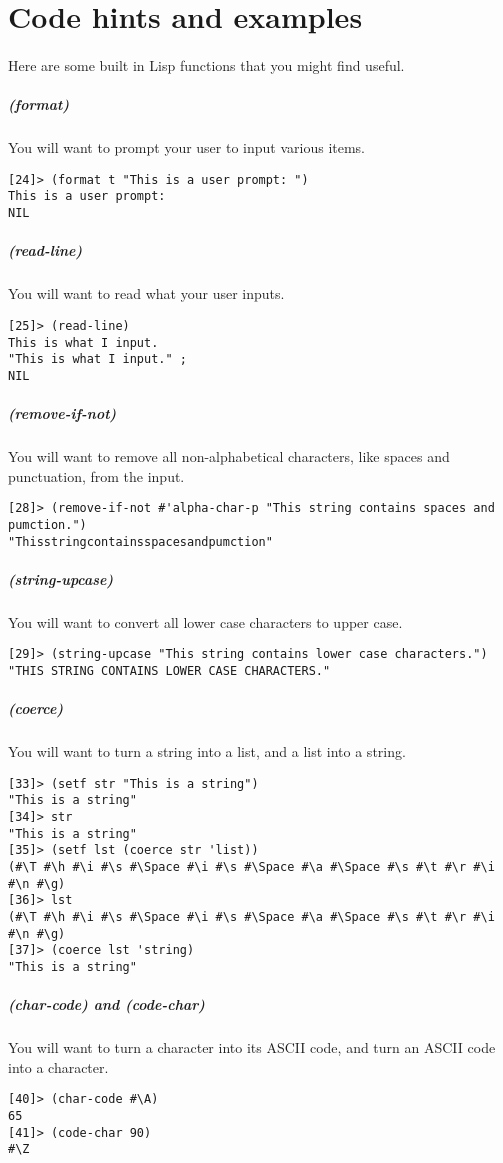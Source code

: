 \documentclass{article}
\begin{document}
\section{Code hints and examples}

\paragraph{}Here are some built in Lisp functions that you might find useful.

\subparagraph{(format)}You will want to prompt your user to input various items.
\begin{verbatim}
[24]> (format t "This is a user prompt: ")
This is a user prompt:
NIL
\end{verbatim}

\subparagraph{(read-line)}You will want to read what your user inputs.
\begin{verbatim}
[25]> (read-line)
This is what I input.
"This is what I input." ;
NIL
\end{verbatim}

\subparagraph{(remove-if-not)}You will want to remove all non-alphabetical characters, like spaces and punctuation, from the input.
\begin{verbatim}
[28]> (remove-if-not #'alpha-char-p "This string contains spaces and pumction.")
"Thisstringcontainsspacesandpumction"
\end{verbatim}

\subparagraph{(string-upcase)}You will want to convert all lower case characters to upper case.
\begin{verbatim}
[29]> (string-upcase "This string contains lower case characters.")
"THIS STRING CONTAINS LOWER CASE CHARACTERS."
\end{verbatim}

\subparagraph{(coerce)}You will want to turn a string into a list, and a list into a string.
\begin{verbatim}
[33]> (setf str "This is a string")
"This is a string"
[34]> str
"This is a string"
[35]> (setf lst (coerce str 'list))
(#\T #\h #\i #\s #\Space #\i #\s #\Space #\a #\Space #\s #\t #\r #\i #\n #\g)
[36]> lst
(#\T #\h #\i #\s #\Space #\i #\s #\Space #\a #\Space #\s #\t #\r #\i #\n #\g)
[37]> (coerce lst 'string)
"This is a string"
\end{verbatim}

\subparagraph{(char-code) and (code-char)}You will want to turn a character into its ASCII code, and turn an ASCII code into a character.
\begin{verbatim}
[40]> (char-code #\A)
65
[41]> (code-char 90)
#\Z
\end{verbatim}
\end{document}
